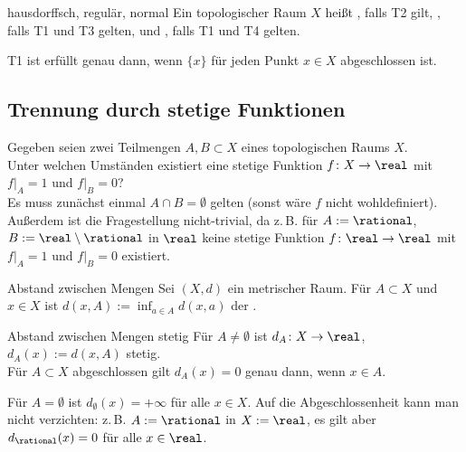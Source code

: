 \begin{Def}{hausdorffsch, regulär, normal}
    Ein topologischer Raum $X$ heißt , falls T2 gilt,
    , falls T1 und T3 gelten, und
    , falls T1 und T4 gelten.
\end{Def}

\begin{Bem}
    T1 ist erfüllt genau dann, wenn $\{x\}$ für jeden Punkt $x \in X$
    abgeschlossen ist.
\end{Bem}

\subsection{%
    Trennung durch stetige Funktionen%
}

\begin{Bem}
    Gegeben seien zwei Teilmengen $A, B \subset X$ eines
    topologischen Raums $X$. \\
    Unter welchen Umständen existiert eine stetige Funktion
    $f\colon X \rightarrow \real$ mit $f|_A = 1$ und $f|_B = 0$? \\
    Es muss zunächst einmal $A \cap B = \emptyset$ gelten
    (sonst wäre $f$ nicht wohldefiniert). \\
    Außerdem ist die Fragestellung nicht-trivial, da z.\,B. für
    $A := \rational$, $B := \real \setminus \rational$ in $\real$
    keine stetige Funktion $f\colon \real \rightarrow \real$
    mit $f|_A = 1$ und $f|_B = 0$ existiert.
\end{Bem}

\begin{Def}{Abstand zwischen Mengen}
    Sei $(X, d)$ ein metrischer Raum.
    Für $A \subset X$ und $x \in X$ ist $d(x, A) := \inf_{a \in A} d(x, a)$
    der .
\end{Def}

\begin{Lemma}{Abstand zwischen Mengen stetig}
    Für $A \not= \emptyset$ ist $d_A\colon X \rightarrow \real$,
    $d_A(x) := d(x, A)$ stetig. \\
    Für $A \subset X$ abgeschlossen gilt $d_A(x) = 0$ genau dann, wenn
    $x \in A$.
\end{Lemma}

\begin{Bem}
    Für $A = \emptyset$ ist $d_\emptyset(x) = +\infty$ für alle $x \in X$.
    Auf die Abgeschlossenheit kann man nicht verzichten:
    z.\,B. $A := \rational$ in $X := \real$, es gilt aber $d_\rational(x) = 0$
    für alle $x \in \real$.
\end{Bem}

